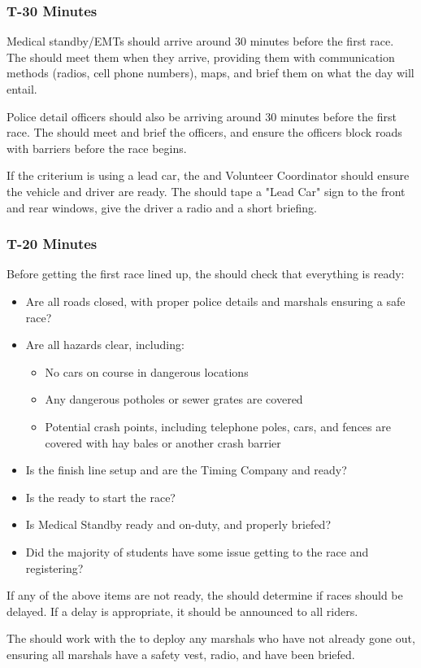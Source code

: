 \subsubsection{T-30 Minutes}

Medical standby/EMTs should arrive around 30 minutes before the first race.
The  should meet them when they arrive,
providing them with communication methods (radios, cell phone numbers), maps, and brief them on what the day will entail.

Police detail officers should also be arriving around 30 minutes before the first race.
The  should meet and brief the officers, and ensure the officers block roads with barriers
before the race begins.

If the criterium is using a lead car, the  and Volunteer Coordinator should ensure the vehicle and driver are ready.
The  should tape a "Lead Car" sign to the front and rear windows,
give the driver a radio and a short briefing.

\subsubsection{T-20 Minutes}

Before getting the first race lined up, the  should check that everything is ready:

\begin{itemize}
  \item Are all roads closed, with proper police details and marshals ensuring a safe race?
  \item Are all hazards clear, including:
  \begin{itemize}
    \item No cars on course in dangerous locations
    \item Any dangerous potholes or sewer grates are covered
    \item Potential crash points, including telephone poles, cars, and fences are covered with hay bales or another crash barrier
  \end{itemize}
  \item Is the finish line setup and are the Timing Company and  ready?
  \item Is the  ready to start the race?
  \item Is Medical Standby ready and on-duty, and properly briefed?
  \item Did the majority of students have some issue getting to the race and registering?
\end{itemize}

If any of the above items are not ready, the  should determine if races should be delayed.
If a delay is appropriate, it should be announced to all riders.

The  should work with the  to deploy any marshals who have not already gone out,
ensuring all marshals have a safety vest, radio, and have been briefed.

